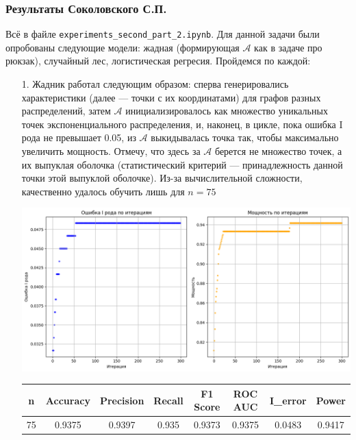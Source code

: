 \documentclass[a4paper,12pt]{article}
\begin{document}
\subsubsection*{Результаты Соколовского С.П.}
Всё в файле \texttt{experiments\_second\_part\_2.ipynb}.
Для данной задачи были опробованы следующие модели: жадная (формирующая $\mathcal{A}$ как в задаче про рюкзак), случайный лес, логистическая регресия. Пройдемся по каждой:
\begin{itemize}
    \item[1.] Жадник работал следующим образом: сперва генерировались характеристики (далее --- точки с их координатами) для графов разных распределений, затем $\mathcal{A}$ инициализировалось как множество уникальных точек экспоненциального распределения, и, наконец, в цикле, пока ошибка I рода не превышает 0.05, из $\mathcal{A}$ выкидывалась точка так, чтобы максимально увеличить мощность. Отмечу, что здесь за $\mathcal{A}$ берется не множество точек, а их выпуклая оболочка (статистический критерий --- принадлежность данной точки этой выпуклой оболочке). Из-за вычислительной сложности, качественно удалось обучить лишь для $n = 75$
    \begin{center}
    \hspace{-2cm} %
    \includegraphics[width=\textwidth]{images/erros_powers.png}
    \hspace{+2cm} %
    \end{center}
    \begin{table}
    \centering
    \begin{tabular}{|c|c|c|c|c|c|c|c|}
        \hline
        n & Accuracy & Precision & Recall & F1 Score & ROC AUC & I\_error & Power \\
        \hline
        75 & 0.9375 & 0.9397 & 0.935 & 0.9373 & 0.9375 & 0.0483 & 0.9417 \\
        \hline

\end{tabular}
\end{table}
\end{itemize}
\end{document}

